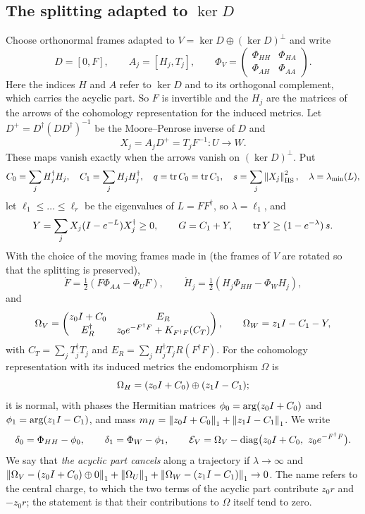 \subsection{The splitting adapted to \texorpdfstring{$\ker D$}{ker D}}
Choose orthonormal frames adapted to $V=\ker D\oplus(\ker D)^\perp$ and write
\[
 D=[0,F],\qquad A_j=[H_j,T_j],\qquad
 \Phi_V=\begin{pmatrix}\Phi_{HH}&\Phi_{HA}\\\Phi_{AH}&\Phi_{AA}\end{pmatrix}.
\]
Here the indices $H$ and $A$ refer to $\ker D$ and to its orthogonal
complement, which carries the acyclic part. So $F$ is invertible and the
$H_j$ are the matrices of the arrows of the cohomology representation for the
induced metrics. Let
$D^+=D^\dagger(DD^\dagger)^{-1}$ be the Moore--Penrose inverse of $D$ and
\[
 X_j=A_jD^+=T_jF^{-1}:U\to W .
\]
These maps vanish exactly when the arrows vanish on $(\ker D)^\perp$. Put
\begin{equation}\label{eq:qslambda}
 C_0=\sum_jH_j^\dagger H_j,\quad C_1=\sum_jH_jH_j^\dagger,\quad
 q=\operatorname{tr} C_0=\operatorname{tr} C_1,\quad s=\sum_j\left\lVert X_j\right\rVert_{\mathrm{HS}}^2,\quad
 \lambda=\lambda_{\min}(L),
\end{equation}
let $\ell_1\leq\dots\leq\ell_r$ be the eigenvalues of $L=FF^\dagger$, so
$\lambda=\ell_1$, and
\begin{equation}\label{eq:Y}
 Y=\sum_jX_j(I-e^{-L})X_j^\dagger\geq0,\qquad G=C_1+Y,\qquad
 \operatorname{tr} Y\geq(1-e^{-\lambda})\,s .
\end{equation}
With the choice of the moving frames made in \cite[\S6.1]{wue26} (the frames
of $V$ are rotated so that the splitting is preserved),
\begin{equation}\label{eq:adapted}
 \dot F=\tfrac12(F\Phi_{AA}-\Phi_UF),\qquad
 \dot H_j=\tfrac12(H_j\Phi_{HH}-\Phi_WH_j),
\end{equation}
and
\begin{equation}\label{eq:adaptedcoeff}
 \Omega_V=\begin{pmatrix}z_0I+C_0&E_R\\E_R^\dagger&z_0e^{-F^\dagger F}+K_{F^\dagger F}(C_T)\end{pmatrix},
 \qquad\Omega_W=z_1I-C_1-Y,
\end{equation}
with $C_T=\sum_jT_j^\dagger T_j$ and $E_R=\sum_jH_j^\dagger T_jR(F^\dagger F)$.
For the cohomology representation with its induced metrics the
endomorphism $\Omega$ is
\[
 \Omega_H=(z_0I+C_0)\oplus(z_1I-C_1);
\]
it is normal, with phases the Hermitian matrices
$\phi_0=\arg(z_0I+C_0)$ and $\phi_1=\arg(z_1I-C_1)$, and mass
$m_H=\left\lVert z_0I+C_0\right\rVert_1+\left\lVert z_1I-C_1\right\rVert_1$. We write
\[
 \delta_0=\Phi_{HH}-\phi_0,\qquad\delta_1=\Phi_W-\phi_1,\qquad
 \mathcal E_V=\Omega_V-\operatorname{diag}\bigl(z_0I+C_0,\ z_0e^{-F^\dagger F}\bigr).
\]
We say that \emph{the acyclic part cancels} along a trajectory if
$\lambda\to\infty$ and
$\left\lVert\Omega_V-(z_0I+C_0)\oplus0\right\rVert_1+\left\lVert\Omega_U\right\rVert_1+\left\lVert\Omega_W-(z_1I-C_1)\right\rVert_1\to0$.
The name refers to the central charge, to which the two terms of the acyclic
part contribute $z_0r$ and $-z_0r$; the statement is that their
contributions to $\Omega$ itself tend to zero.

